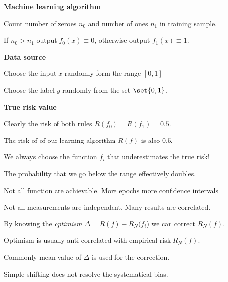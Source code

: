\documentclass[landscape,footrule]{foils}
\begin{document}

\textbf{Machine learning algorithm}
\begin{triangles}
\item Count number of zeroes $n_0$ and number of ones $n_1$ in training sample.
\item If $n_0>n_1$ output $f_0(x)\equiv 0$, otherwise output $f_1(x)\equiv 1$.
\end{triangles}
\vspace*{1cm}

\textbf{Data source}
\begin{triangles}
\item Choose the input $x$ randomly form the range $[0,1]$
\item Choose the label $y$ randomly from the set $\set{0,1}$.
\end{triangles}

\vspace*{1cm}
\textbf{True risk value}
\begin{triangles}
\item Clearly the risk of both rules $R(f_0)=R(f_1)=0.5$.
\item The risk of of our learning algorithm $R(f)$ is also $0.5$. 
\end{triangles}



\begin{triangles}
\item We always choose the function $f_i$ that underestimates the true risk!
\item The probability that we go below the range effectively doubles. 
\end{triangles}



\begin{triangles}
\item Not all function are achievable. More epochs more confidence intervals
\item Not all measurements are independent. Many results are correlated.
\end{triangles}


\vspace*{0.5cm}
By knowing the \emph{optimism} $\Delta=R(f)-R_N(f_i$) we can correct $R_N(f)$.   
\begin{triangles}
\item Optimism is usually anti-correlated with empirical risk $R_N(f)$.   
\item Commonly mean value of $\Delta$ is used for the correction. 
\item Simple shifting does not resolve the systematical bias.  
\end{triangles}
\end{document}
